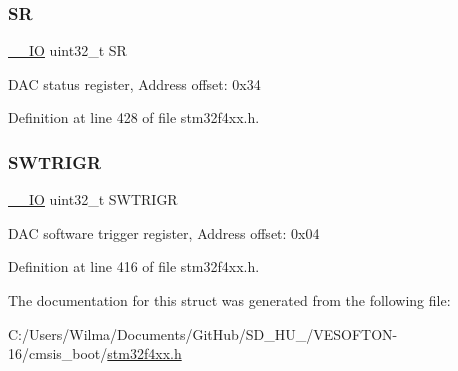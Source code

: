 \subsubsection{\texorpdfstring{SR}{SR}}
{\footnotesize\ttfamily \hyperlink{group___c_m_s_i_s__core__definitions_gaec43007d9998a0a0e01faede4133d6be}{\+\_\+\+\_\+\+IO} uint32\+\_\+t SR}

D\+AC status register, Address offset\+: 0x34 

Definition at line 428 of file stm32f4xx.\+h.

\mbox{\label{struct_d_a_c___type_def_a896bbb7153af0b67ad772360feaceeb4}} 
\subsubsection{\texorpdfstring{S\+W\+T\+R\+I\+GR}{SWTRIGR}}
{\footnotesize\ttfamily \hyperlink{group___c_m_s_i_s__core__definitions_gaec43007d9998a0a0e01faede4133d6be}{\+\_\+\+\_\+\+IO} uint32\+\_\+t S\+W\+T\+R\+I\+GR}

D\+AC software trigger register, Address offset\+: 0x04 

Definition at line 416 of file stm32f4xx.\+h.



The documentation for this struct was generated from the following file\+:\begin{DoxyCompactItemize}
\item 
C\+:/\+Users/\+Wilma/\+Documents/\+Git\+Hub/\+S\+D\+\_\+\+H\+U\+\_/\+V\+E\+S\+O\+F\+T\+O\+N-\/16/cmsis\+\_\+boot/\hyperlink{stm32f4xx_8h}{stm32f4xx.\+h}\end{DoxyCompactItemize}
